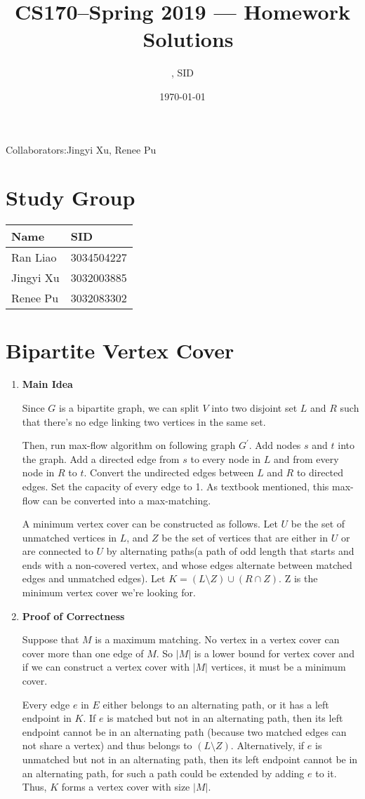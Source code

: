 \documentclass[11pt]{article}
\title{CS170--Spring 2019 --- Homework \Homework\ Solutions}
\author{\Name, SID \SID}
\date{\today}
\newenvironment{qparts}{\begin{enumerate}[{(}a{)}]}{\end{enumerate}}
\begin{document}
\maketitle
Collaborators:Jingyi Xu, Renee Pu

\section{Study Group}
	\begin{tabular}{ll}
		Name		&   SID         		\\\hline
		Ran Liao		&   3034504227  	\\  
		Jingyi Xu		&   3032003885  	\\
		Renee Pu		&   3032083302  	\\
	\end{tabular}

	
\newpage
\section{Bipartite Vertex Cover}
\begin{qparts}
	\item \textbf{Main Idea}
	
	Since $G$ is a bipartite graph, we can split $V$ into two disjoint set $L$ and $R$ such that there's no edge linking two vertices in the same set.
	
	Then, run max-flow algorithm on following graph $G^\prime$. Add nodes $s$ and $t$ into the graph. Add a directed edge from $s$ to every node in $L$ and from every node in $R$ to $t$. Convert the undirected edges between $L$ and $R$ to directed edges. Set the capacity of every edge to 1. As textbook mentioned, this max-flow can be converted into a max-matching.
	
	A minimum vertex cover can be constructed as follows. Let $U$ be the set of unmatched vertices in $L$, and $Z$ be the set of vertices that are either in $U$ or are connected to $U$ by alternating paths(a path of odd length that starts and ends with a non-covered vertex, and whose edges alternate between matched edges and unmatched edges). Let $K = (L \setminus Z) \cup (R \cap Z)$. Z is the minimum vertex cover we're looking for.
	
	\item \textbf{Proof of Correctness}
	
	Suppose that $M$ is a maximum matching. No vertex in a vertex cover can cover more than one edge of $M$. So $|M|$ is a lower bound for vertex cover and if we can construct a vertex cover with $|M|$ vertices, it must be a minimum cover.
	
	Every edge $e$ in $E$ either belongs to an alternating path, or it has a left endpoint in $K$. If $e$ is matched but not in an alternating path, then its left endpoint cannot be in an alternating path (because two matched edges can not share a vertex) and thus belongs to $(L \setminus Z)$. Alternatively, if $e$ is unmatched but not in an alternating path, then its left endpoint cannot be in an alternating path, for such a path could be extended by adding $e$ to it. Thus, $K$ forms a vertex cover with size $|M|$.
	
\end{qparts}
\end{document}

